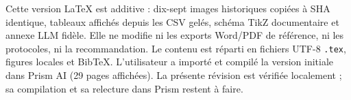Cette version LaTeX est additive : dix-sept images historiques copiées à SHA
identique, tableaux affichés depuis les CSV gelés, schéma TikZ documentaire et
annexe LLM fidèle. Elle ne modifie ni les exports Word/PDF de référence, ni
les protocoles, ni la recommandation. Le contenu est réparti en fichiers UTF-8
\texttt{.tex}, figures locales et BibTeX. L'utilisateur a importé et compilé
la version initiale dans Prism AI (29 pages affichées). La présente révision
est vérifiée localement ; sa compilation et sa relecture dans Prism restent à faire.

